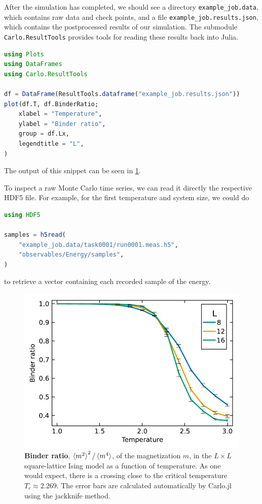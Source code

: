 \documentclass{SciPost}
\begin{document}
After the simulation has completed, we should see a directory \texttt{example\_{}job.data}, which contains raw data and check points, and a file \texttt{example\_{}job.results.json}, which contains the postprocessed results of our simulation.
The submodule \texttt{Carlo.ResultTools} provides tools for reading these results back into Julia.
\begin{lstlisting}[language=julia]
using Plots
using DataFrames
using Carlo.ResultTools

df = DataFrame(ResultTools.dataframe("example_job.results.json"))
plot(df.T, df.BinderRatio;
    xlabel = "Temperature",
    ylabel = "Binder ratio",
    group = df.Lx,
    legendtitle = "L",
)
\end{lstlisting}
The output of this snippet can be seen in \cref{fig:binder}.

To inspect a raw Monte Carlo time series, we can read it directly the respective HDF5 file. For example, for the first temperature and system size, we could do
\begin{lstlisting}[language=julia]
using HDF5

samples = h5read(
    "example_job.data/task0001/run0001.meas.h5",
    "observables/Energy/samples",
)
\end{lstlisting}
to retrieve a vector containing each recorded sample of the energy.
\begin{figure}
\begin{center}
\includegraphics[scale=0.625]{figs/binder_ratio.pdf}
\end{center}
\caption{\textbf{Binder ratio}, $\braket{m^2}^2/\braket{m^4}$, of the magnetization $m$, in the $L\times L$ square-lattice Ising model as a function of temperature. As one would expect, there is a crossing close to the critical temperature $T_c \approx 2.269$. The error bars are calculated automatically by Carlo.jl using the jackknife method.}
\label{fig:binder}
\end{figure}
\end{document}
